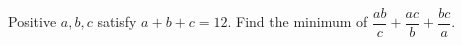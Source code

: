 Positive $a,b,c$ satisfy $a+b+c=12$. Find the minimum of $\dfrac{ab}{c}+\dfrac{ac}{b}+\dfrac{bc}{a}$.
